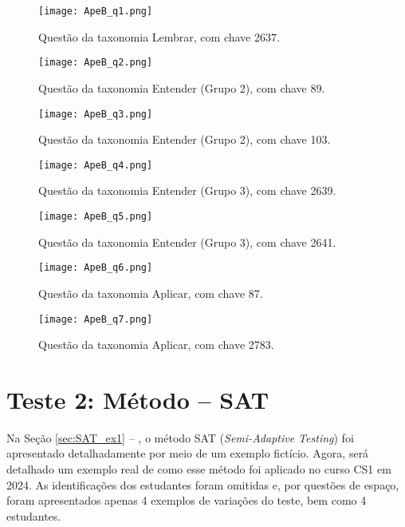 \begin{figure}[!ht]
    \centering
    \texttt{[image: ApeB\_q1.png]}
     \caption{Questão da taxonomia Lembrar, com chave 2637.}
  \label{fig:ApeB_q1}
\end{figure}

\begin{figure}[!ht]
    \centering
    \texttt{[image: ApeB\_q2.png]}
     \caption{Questão da taxonomia Entender (Grupo 2), com chave 89.}
  \label{fig:ApeB_q2}
\end{figure}

\begin{figure}[!ht]
    \centering
    \texttt{[image: ApeB\_q3.png]}
     \caption{Questão da taxonomia Entender (Grupo 2), com chave 103.}
  \label{fig:ApeB_q3}
\end{figure}

\begin{figure}[!ht]
    \centering
    \texttt{[image: ApeB\_q4.png]}
     \caption{Questão da taxonomia Entender (Grupo 3), com chave 2639.}
  \label{fig:ApeB_q4}
\end{figure}

\begin{figure}[!ht]
    \centering
    \texttt{[image: ApeB\_q5.png]}
     \caption{Questão da taxonomia Entender (Grupo 3), com chave 2641.}
  \label{fig:ApeB_q5}
\end{figure}

\begin{figure}[!ht]
    \centering
    \texttt{[image: ApeB\_q6.png]}
     \caption{Questão da taxonomia Aplicar, com chave 87.}
  \label{fig:ApeB_q6}
\end{figure}

\begin{figure}[!ht]
    \centering
    \texttt{[image: ApeB\_q7.png]}
     \caption{Questão da taxonomia Aplicar, com chave 2783.}
  \label{fig:ApeB_q7}
\end{figure}


\section{Teste 2: Método -- SAT}

Na Seção \ref{sec:SAT_ex1} -- , o método SAT (\textit{Semi-Adaptive Testing}) foi apresentado detalhadamente por meio de um exemplo fictício. Agora, será detalhado um exemplo real de como esse método foi aplicado no curso CS1 em 2024. As identificações dos estudantes foram omitidas e, por questões de espaço, foram apresentados apenas 4 exemplos de variações do teste, bem como 4 estudantes.

